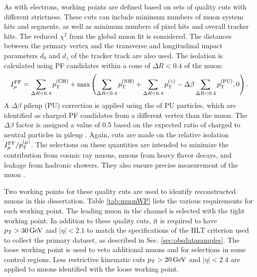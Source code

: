 As with electrons, working points are defined based on sets of quality cuts with different strictness. These cuts can include minimum numbers of muon system hits and segments, as well as minimum numbers of pixel hits and overall tracker hits. The reduced $\chi^2$ from the global muon fit is considered. The distances between the primary vertex and the transverse and longitudinal impact parameters $d_0$ and $d_z$ of the tracker track are also used. The isolation is calculated using PF candidates within a cone of $\Delta R < 0.4$ of the muon:
\begin{equation}
I^{\text{PF}}_{\mu} = \sum_{\Delta R < 0.4}{p_{\mathrm{T}}^{(\text{CH})}} + \text{max}\left( \sum_{\Delta R < 0.4}{p_{\mathrm{T}}^{(\text{NH})}} + \sum_{\Delta R < 0.4}{p_{\mathrm{T}}^{(\gamma)}} - \Delta\beta \sum_{\Delta R < 0.4}{p_{\mathrm{T}}^{(\text{PU})}}, 0 \right).
\end{equation}
A $\Delta\beta$ pileup (PU) correction is applied using the \pt of PU particles, which are identified as charged PF candidates from a different vertex than the muon. The $\Delta\beta$ factor is assigned a value of 0.5 based on the expected ratio of charged to neutral particles in pileup \cite{CMS-PAS-PFT-10-002}. Again, cuts are made on the relative isolation $I^{\text{PF}}_{\mu}/p_{\mathrm{T}}^{(\mu)}$. The selections on these quantities are intended to minimize the contribution from cosmic ray muons, muons from heavy flavor decays, and leakage from hadronic showers. They also ensure precise measurement of the muon \pt.

Two working points for these quality cuts are used to identify reconstructed muons in this dissertation. Table \ref{tab:muonWP} lists the various requirements for each working point. The leading muon in the \mutau channel is selected with the tight working point. In addition to these quality cuts, it is required to have $p_{\mathrm{T}}>30\,\text{Ge\hspace{-.08em}V}$ and $|\eta|<2.1$ to match the specifications of the HLT criterion used to collect the primary dataset, as described in Sec. \ref{sec:obsdatasamples}. The loose working point is used to veto additional muons and for selections in some control regions. Less restrictive kinematic cuts $p_{\mathrm{T}}>20\,\text{Ge\hspace{-.08em}V}$ and $|\eta|<2.4$ are applied to muons identified with the loose working point.

